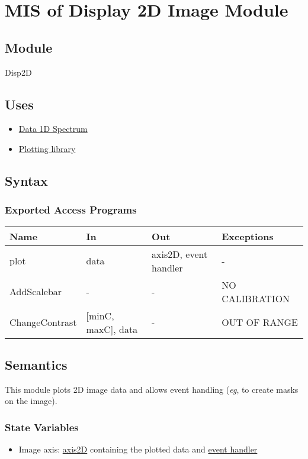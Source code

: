 \documentclass[12pt, titlepage]{article}
\begin{document}
\section{MIS of Display 2D Image Module} \label{Mod:Disp2D}

\subsection{Module}

Disp2D

\subsection{Uses}
\begin{itemize}
    \item \hyperref[Mod:Spectrum]{Data 1D Spectrum}
    \item \hyperref[Mod:Plotting]{Plotting library}
\end{itemize}

\subsection{Syntax}

\subsubsection{Exported Access Programs}

\begin{center}
    \begin{tabular}{p{4cm} p{3cm} p{3cm} p{4cm}}
        \hline
        \textbf{Name} & \textbf{In} & \textbf{Out} & \textbf{Exceptions} \\
        \hline
        plot & data & axis2D, event handler & - \\
        AddScalebar & - & - & NO CALIBRATION \\
        ChangeContrast & [minC, maxC], data & - & OUT OF RANGE \\
        \hline
    \end{tabular}
\end{center}

\subsection{Semantics}
This module plots 2D image data and allows event handling (\textit{eg}, to
create masks on the image).

\subsubsection{State Variables}
\begin{itemize}
    \item Image axis: \hyperref[Mod:Plotting]{axis2D} containing the plotted
    data and \hyperref[Mod:Plotting]{event handler}
\end{itemize}
\end{document}
